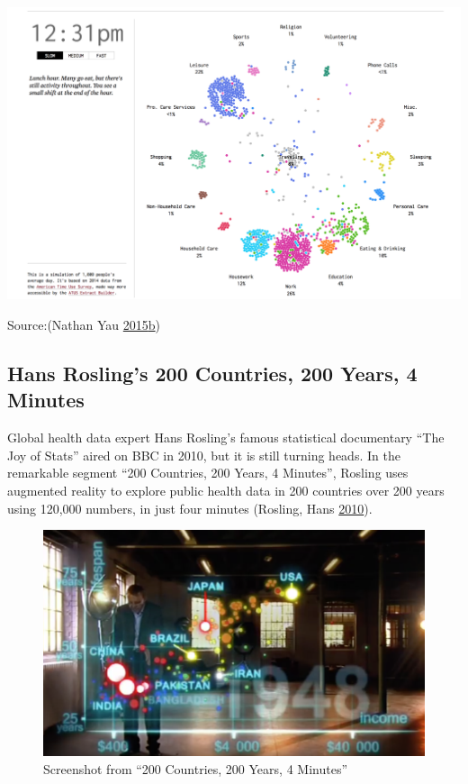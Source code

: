 \documentclass[]{book}
\begin{document}
\includegraphics{images/life_of_americans.png}

Source:(Nathan Yau \protect\hyperlink{ref-American_life}{2015}\protect\hyperlink{ref-American_life}{b})

\hypertarget{hans-roslings-200-countries-200-years-4-minutes}{%
\subsection{Hans Rosling's 200 Countries, 200 Years, 4 Minutes}\label{hans-roslings-200-countries-200-years-4-minutes}}

Global health data expert Hans Rosling's famous statistical documentary ``The Joy of Stats'' aired on BBC in 2010, but it is still turning heads. In the remarkable segment ``200 Countries, 200 Years, 4 Minutes'', Rosling uses augmented reality to explore public health data in 200 countries over 200 years using 120,000 numbers, in just four minutes (Rosling, Hans \protect\hyperlink{ref-hans_rosling}{2010}).

\begin{figure}
\centering
\includegraphics{images/200_countries_years.png}
\caption{Screenshot from ``200 Countries, 200 Years, 4 Minutes''}
\end{figure}
\end{document}
